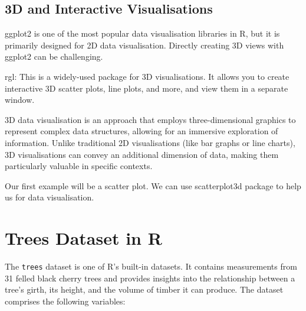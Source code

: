\documentclass{article}\usepackage[]{graphicx}\usepackage[]{xcolor}
\begin{document}
{{\subsection{3D and Interactive Visualisations}
ggplot2 is one of the most popular data visualisation libraries in R, but it is primarily designed for 2D data visualisation. Directly creating 3D views with ggplot2 can be challenging.

rgl: This is a widely-used package for 3D visualisations. It allows you to create interactive 3D scatter plots, line plots, and more, and view them in a separate window.

3D data visualisation is an approach that employs three-dimensional graphics to represent complex data structures, allowing for an immersive exploration of information. Unlike traditional 2D visualisations (like bar graphs or line charts), 3D visualisations can convey an additional dimension of data, making them particularly valuable in specific contexts.

Our first example will be  a scatter plot. We can use scatterplot3d package  to help us for data visualisation.
\section{Trees Dataset in R}

The \texttt{trees} dataset is one of R's built-in datasets. It contains measurements from 31 felled black cherry trees and provides insights into the relationship between a tree's girth, its height, and the volume of timber it can produce. The dataset comprises the following variables:

}}
\end{document}
